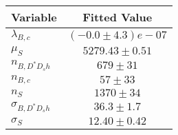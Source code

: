 \begin{tabular}[t]{lc}
\hline
Variable &Fitted Value\\
\hline\hline
$\lambda_{B,c}$&$(-0.0\pm4.3)e-07$\\
\hline
$\mu_S$&$5279.43\pm0.51$\\
\hline
$n_{B, D^* D_s h}$&$679\pm31$\\
\hline
$n_{B,c}$&$57\pm33$\\
\hline
$n_S$&$1370\pm34$\\
\hline
$\sigma_{B, D^* D_s h}$&$36.3\pm1.7$\\
\hline
$\sigma_S$&$12.40\pm0.42$\\
\hline
\end{tabular}